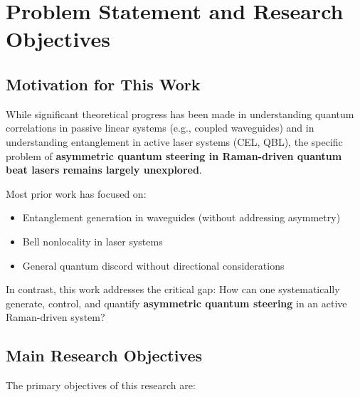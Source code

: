 \section{Problem Statement and Research Objectives}

\subsection{Motivation for This Work}

While significant theoretical progress has been made in understanding quantum correlations in passive linear systems (e.g., coupled waveguides) and in understanding entanglement in active laser systems (CEL, QBL), the specific problem of \textbf{asymmetric quantum steering in Raman-driven quantum beat lasers remains largely unexplored}.

Most prior work has focused on:
\begin{itemize}
	\item Entanglement generation in waveguides (without addressing asymmetry)
	\item Bell nonlocality in laser systems
	\item General quantum discord without directional considerations
\end{itemize}

In contrast, this work addresses the critical gap: How can one systematically generate, control, and quantify \textbf{asymmetric quantum steering} in an active Raman-driven system?

\subsection{Main Research Objectives}

The primary objectives of this research are:

